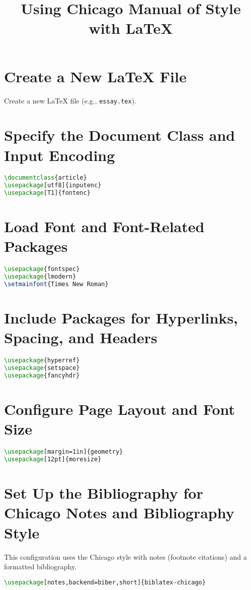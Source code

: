 \documentclass{article}
\title{Using Chicago Manual of Style with LaTeX}
\author{}
\date{}
\begin{document}
\maketitle

\section{Create a New LaTeX File}
Create a new LaTeX file (e.g., \texttt{essay.tex}).

\section{Specify the Document Class and Input Encoding}
\begin{lstlisting}[language=TeX]
\documentclass{article}
\usepackage[utf8]{inputenc}
\usepackage[T1]{fontenc}
\end{lstlisting}

\section{Load Font and Font-Related Packages}
\begin{lstlisting}[language=TeX]
\usepackage{fontspec}
\usepackage{lmodern}
\setmainfont{Times New Roman}
\end{lstlisting}

\section{Include Packages for Hyperlinks, Spacing, and Headers}
\begin{lstlisting}[language=TeX]
\usepackage{hyperref}
\usepackage{setspace}
\usepackage{fancyhdr}
\end{lstlisting}

\section{Configure Page Layout and Font Size}
\begin{lstlisting}[language=TeX]
\usepackage[margin=1in]{geometry}
\usepackage[12pt]{moresize}
\end{lstlisting}

\section{Set Up the Bibliography for Chicago Notes and Bibliography Style}
This configuration uses the Chicago style with notes (footnote citations) and a formatted bibliography.
\begin{lstlisting}[language=TeX]
\usepackage[notes,backend=biber,short]{biblatex-chicago}

\end{lstlisting}
\end{document}

